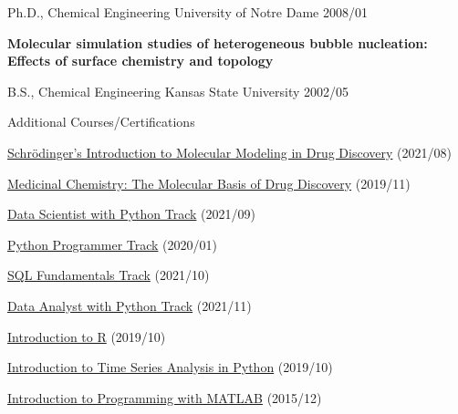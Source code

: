 
\begin{cventries}
  \cventry
    {Ph.D., Chemical Engineering} %
    {University of Notre Dame} %
    {} %
    {2008/01} %
    {
      \begin{cvitems} %
         \item {\textbf{Molecular simulation studies of heterogeneous bubble nucleation: Effects of surface chemistry and topology}}
      \end{cvitems}
    }
    
    \cventry
      {B.S., Chemical Engineering}
      {Kansas State University}
      {}
      {2002/05}
      {}

  \vspace{-10pt}
      
  \cventry
    {}
    {Additional Courses/Certifications}
    {}
    {}
    {
        \begin{cvitems}
            \item{\href{https://api.badgr.io/public/assertions/zZ7-bHnkTcm6H_UNr2s-LA}{Schrödinger's Introduction to Molecular Modeling in Drug Discovery} (2021/08)}           
            \item{\href{https://courses.edx.org/certificates/27307d91954041dab94af0ff554bc378}{Medicinal Chemistry: The Molecular Basis of Drug Discovery} (2019/11)}
            \item{\href{https://www.datacamp.com/statement-of-accomplishment/track/2bb866790e6f6cda38fbc31ede0fb670e8c3bd5e}{Data Scientist with Python Track} (2021/09)}                        \item{\href{https://www.datacamp.com/statement-of-accomplishment/track/546928503f3ccea8a2ef53a6040f43997381f967}{Python Programmer Track} (2020/01)}
            \item{\href{https://www.datacamp.com/statement-of-accomplishment/track/941904e6394e2951693441d466f4643e5edfb4de}{SQL Fundamentals Track} (2021/10)}
            \item{\href{https://www.datacamp.com/statement-of-accomplishment/track/58a2874f38ce2a5127d0f39e7a4d5ee36bf86349}{Data Analyst with Python Track} (2021/11)}
            \item{\href{https://www.datacamp.com/statement-of-accomplishment/course/dd5746b9564cf374bcc0bb379e1801925e25259e}{Introduction to R} (2019/10)}
            \item{\href{https://www.datacamp.com/statement-of-accomplishment/course/807548ea866063da3c0083afcebf3be48d44f277}{Introduction to Time Series Analysis in Python} (2019/10)}
            \item {\href{https://www.coursera.org/account/accomplishments/verify/9G7V69L6QP}{Introduction to Programming with MATLAB} (2015/12)}
        \end{cvitems}      
    }

\end{cventries}
